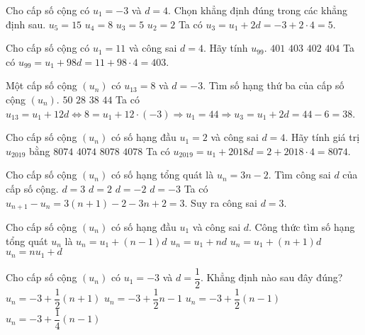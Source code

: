 \begin{ex}%
Cho cấp số cộng có $ u_1=-3 $ và $ d=4 $. Chọn khẳng định đúng trong các khẳng định sau.
\choice
{$ u_5=15 $}
{$ u_4=8 $}
{\True $ u_3=5 $}
{$ u_2=2 $}
\loigiai
{
	Ta có $ u_3=u_1+2d=-3+2\cdot4=5 $.
}
\end{ex}
\begin{ex}%
Cho cấp số cộng có $ u_1=11 $ và công sai $ d=4 $. Hãy tính $ u_{99} $.
\choice
{$ 401 $}
{\True $ 403 $}
{$ 402 $}
{$ 404 $}
\loigiai
{
	Ta có $ u_{99}=u_1+98d=11+98\cdot4=403 $.
}
\end{ex}
\begin{ex}%
Một cấp số cộng $ (u_n) $ có $ u_{13}=8 $ và $ d=-3 $. Tìm số hạng thứ ba của cấp số cộng $ (u_n) $.
\choice
{$ 50 $}
{$ 28 $}
{\True $ 38 $}
{$ 44 $}
\loigiai
{
	Ta có $ u_{13}=u_1+12d \Leftrightarrow 8=u_1+12\cdot(-3)\Rightarrow u_1=44 \Rightarrow u_{3}=u_1+2d=44-6=38$.
}
\end{ex}
\begin{ex}%
Cho cấp số cộng $(u_n) $ có số hạng đầu $ u_1=2 $ và công sai $ d=4 $. Hãy tính giá trị $ u_{2019} $ bằng
\choice
{\True $ 8074 $}
{$ 4074 $}
{$ 8078 $}
{$ 4078 $}
\loigiai
{
	Ta có $ u_{2019}=u_1+2018d=2+2018\cdot 4=8074 $.
}
\end{ex}
\begin{ex}%
Cho cấp số cộng $ (u_n) $ có số hạng tổng quát là $ u_n=3n-2 $. Tìm công sai $ d $ của cấp số cộng.
\choice
{\True $ d=3 $}
{$ d=2 $}
{$ d=-2 $}
{$ d=-3 $}
\loigiai
{
	Ta có $ u_{n+1}-u_n=3(n+1)-2-3n+2=3 $. Suy ra công sai $ d=3 $.
}
\end{ex}

\begin{ex}%
	Cho cấp số cộng $(u_n)$ có số hạng đầu $u_1$ và công sai $d$. Công thức tìm số hạng tổng quát $u_n$ là 
	\choice
	{\True $u_n=u_1+(n-1)d$}
	{$u_n=u_1+nd$}
	{$u_n=u_1+(n+1)d$}
	{$u_n=nu_1+d$}
\end{ex}

\begin{ex}%
	Cho cấp số cộng $(u_n)$ có $u_1=-3$ và $d=\dfrac{1}{2}$. Khẳng định nào sau đây đúng?
	\choice
	{$u_n=-3+\dfrac{1}{2}(n+1 )$}
	{$u_n=-3+\dfrac{1}{2}n-1$}
	{\True $u_n=-3+\dfrac{1}{2}(n-1)$}
	{$u_n=-3+\dfrac{1}{4}(n-1 )$}
\end{ex}

